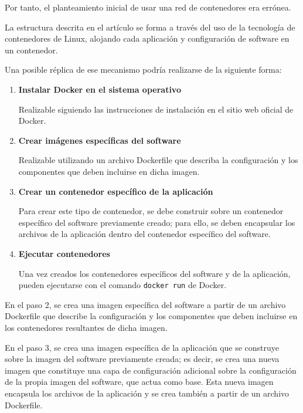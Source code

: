                 Por tanto, el planteamiento inicial de usar una red de contenedores era errónea.
                
                La estructura descrita en el artículo se forma a través del uso de la tecnología de contenedores de Linux, alojando cada aplicación y configuración de software en un contenedor.

                Una posible réplica de ese mecanismo podría realizarse de la siguiente forma:

                \begin{enumerate}

                    \item \textbf{Instalar Docker en el sistema operativo}
                    
                    Realizable siguiendo las instrucciones de instalación en el sitio web oficial de Docker.
                
                    \item \textbf{Crear imágenes específicas del software}
                    
                    Realizable utilizando un archivo Dockerfile que describa la configuración y los componentes que deben incluirse en dicha imagen.

                    \item \textbf{Crear un contenedor específico de la aplicación}

                    Para crear este tipo de contenedor, se debe construir sobre un contenedor específico del software previamente creado; para ello, se deben encapsular los archivos de la aplicación dentro del contenedor específico del software.

                    \item \textbf{Ejecutar contenedores}
                    
                    Una vez creados los contenedores específicos del software y de la aplicación, pueden ejecutarse con el comando \texttt{docker run} de Docker.

                \end{enumerate}

                En el paso 2, se crea una imagen específica del software a partir de un archivo Dockerfile que describe la configuración y los componentes que deben incluirse en los contenedores resultantes de dicha imagen.

                En el paso 3, se crea una imagen específica de la aplicación que se construye sobre la imagen del software previamente creada; es decir, se crea una nueva imagen que constituye una capa de configuración adicional sobre la configuración de la propia imagen del software, que actua como base. Esta nueva imagen encapsula los archivos de la aplicación y se crea también a partir de un archivo Dockerfile.


